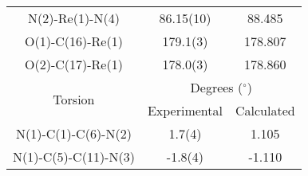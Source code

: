 \begin{table}[htbp]
\begin{tabular}{ccc}
    N(2)-Re(1)-N(4) & 86.15(10) & 88.485 \\
    O(1)-C(16)-Re(1) & 179.1(3) & 178.807 \\
    O(2)-C(17)-Re(1) & 178.0(3) & 178.860 \\
    \multirow{2}{*}{Torsion} & \multicolumn{2}{c}{Degrees ($^\circ$)} \\ \cline{2-3}
     & Experimental & Calculated \\ \midrule
    N(1)-C(1)-C(6)-N(2) & 1.7(4) & 1.105 \\
    N(1)-C(5)-C(11)-N(3) & -1.8(4) & -1.110 \\
    \bottomrule
    \end{tabular}%
  \label{tab.da8}%
\end{table}%
